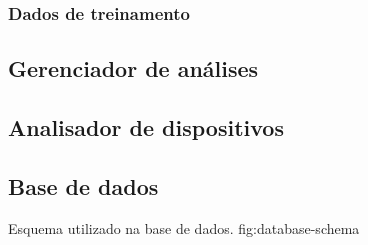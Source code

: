 \subsubsection{Dados de treinamento}



\subsection{Gerenciador de análises}


\subsection{Analisador de dispositivos}


\subsection{Base de dados}

  {Esquema utilizado na base de dados.}
  {fig:database-schema}
\fi
